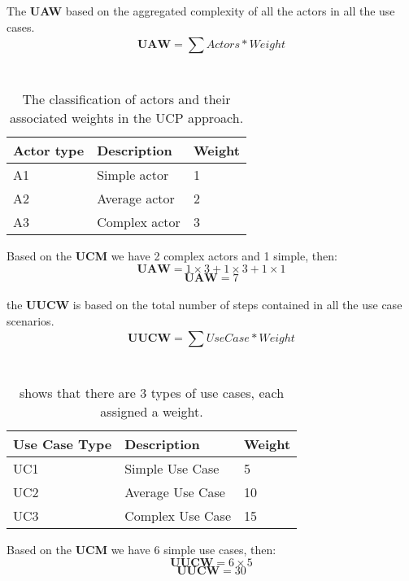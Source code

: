 \documentclass[12pt]{article}
\begin{document}
The \textbf{UAW} based on the aggregated complexity of all the actors in all the use cases.
\begin{equation}
    \textbf{UAW} = \sum^{}_{}{Actors * Weight}
\end{equation}\\
\begin{table}[h]
\centering
\caption{The classification of actors and their associated weights in the UCP approach.}
\begin{tabular}{|l|l|l|}
\hline
\textbf{Actor type} & \textbf{Description} & \textbf{Weight} \\ \hline
A1                  & Simple actor         & 1               \\ \hline
A2                  & Average actor        & 2               \\ \hline
A3                  & Complex actor        & 3               \\ \hline
\end{tabular}
\end{table}
Based on the \textbf{UCM} we have 2 complex actors and 1 simple, then:
\begin{equation}
    \textbf{UAW} = 1\times3 + 1\times3 + 1\times1
\end{equation}
\begin{equation}
    \textbf{UAW} = 7
\end{equation}\\

the \textbf{UUCW} is based on the total number of steps contained in all the use case scenarios.
\begin{equation}
    \textbf{UUCW} = \sum^{}_{}{UseCase * Weight}
\end{equation}\\
\begin{table}[h]
\centering
\caption{shows that there are 3 types of use cases, each assigned a weight. }
\begin{tabular}{|l|l|l|}
\hline
\textbf{Use Case Type} & \textbf{Description} & \textbf{Weight} \\ \hline
UC1                    & Simple Use Case      & 5               \\ \hline
UC2                    & Average Use Case     & 10              \\ \hline
UC3                    & Complex Use Case     & 15              \\ \hline
\end{tabular}
\end{table}
Based on the \textbf{UCM} we have 6 simple use cases, then:
\begin{equation}
    \textbf{UUCW} = 6 \times 5
\end{equation}
\begin{equation}
    \textbf{UUCW} = 30
\end{equation}\\
\end{document}
